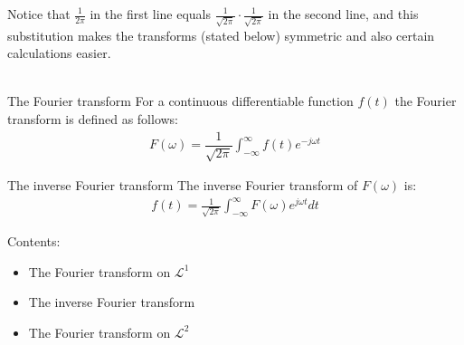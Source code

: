 Notice that $\frac{1}{2\pi}$ in the first line equals $\frac{1}{\sqrt{2\pi}} \cdot \frac{1}{\sqrt{2\pi}}$ in the second line, and this substitution makes the transforms (stated below) symmetric and also certain calculations easier. \cite{Page 10, FourierTrans}
\\ \\
\begin{definition}{The Fourier transform}
For a continuous differentiable function $f(t)$ the Fourier transform is defined as follows:
\begin{align*}
F(\omega) = \dfrac{1}{\sqrt{2\pi}} \int_{-\infty}^\infty f(t) e^{-j \omega t}
\end{align*}
\end{definition}

\begin{definition}{The inverse Fourier transform}
The inverse Fourier transform of $F(\omega)$ is:
\begin{align*}
f(t) = \frac{1}{\sqrt{2\pi}} \int_{-\infty}^\infty F(\omega) e^{j \omega t} dt
\end{align*}
\end{definition}

Contents:
\begin{itemize}
\item The Fourier transform on $\mathcal{L}^1$
\item The inverse Fourier transform
\item The Fourier transform on $\mathcal{L}^2$
\end{itemize}